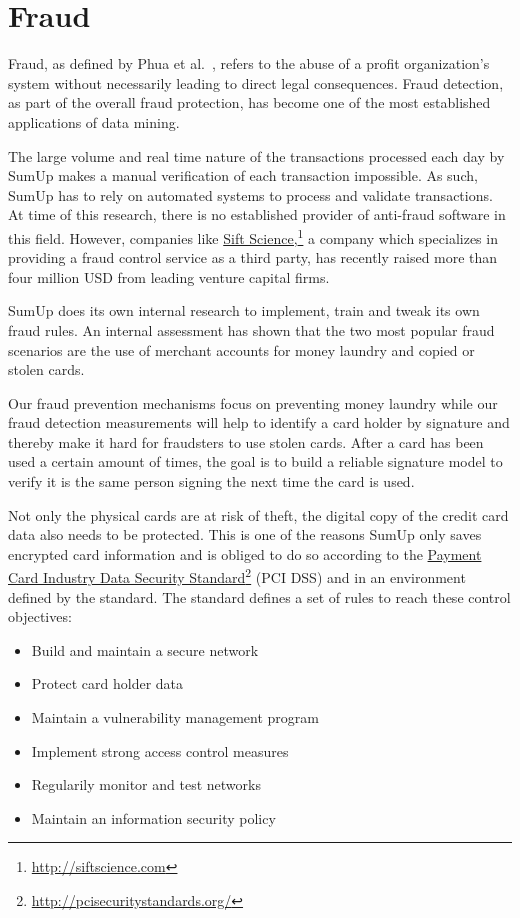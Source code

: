 \documentclass[a4paper, oneside]{csthesis}
\newcommand\fnurl[2]{%
  \href{#2}{#1}\footnote{\url{#2}}%
}
\begin{document}
\section{Fraud}

Fraud, as defined by Phua et al.~\cite{5522816}, refers to the abuse of a profit organization's system without necessarily leading to direct legal consequences. Fraud detection, as part of the overall fraud protection, has become one of the most established applications of data mining.

The large volume and real time nature of the transactions processed each day by SumUp makes a manual verification of each transaction impossible. As such, SumUp has to rely on automated systems to process and validate transactions. At time of this research, there is no established provider of anti-fraud software in this field. However, companies like \fnurl{Sift Science,}{http://siftscience.com} a company which specializes in providing a fraud control service as a third party, has recently raised more than four million USD from leading venture capital firms.

SumUp does its own internal research to implement, train and tweak its own fraud rules. An internal assessment has shown that the two most popular fraud scenarios are the use of merchant accounts for money laundry and copied or stolen cards.

Our fraud prevention mechanisms focus on preventing money laundry while our fraud detection measurements will help to identify a card holder by signature and thereby make it hard for fraudsters to use stolen cards. After a card has been used a certain amount of times, the goal is to  build a reliable signature model to verify it is the same person signing the next time the card is used.

Not only the physical cards are at risk of theft, the digital copy of the credit card data also needs to be protected. This is one of the reasons SumUp only saves encrypted card information and is obliged to do so according to the \fnurl{Payment Card Industry Data Security Standard}{http://pcisecuritystandards.org/} (PCI DSS) and in an environment defined by the standard. The standard defines a set of rules to reach these control objectives:
\begin{itemize}
\item Build and maintain a secure network
\item Protect card holder data
\item Maintain a vulnerability management program
\item Implement strong access control measures
\item Regularily monitor and test networks
\item Maintain an information security policy
\end{itemize}
\end{document}
